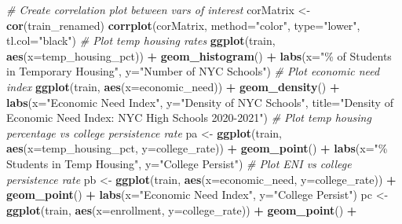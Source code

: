 \documentclass[
  man,floatsintext]{apa6}
\newenvironment{Shaded}{\begin{snugshade}}{\end{snugshade}}
\newcommand{\AttributeTok}[1]{\textcolor[rgb]{0.13,0.29,0.53}{#1}}
\newcommand{\CommentTok}[1]{\textcolor[rgb]{0.56,0.35,0.01}{\textit{#1}}}
\newcommand{\FunctionTok}[1]{\textcolor[rgb]{0.13,0.29,0.53}{\textbf{#1}}}
\newcommand{\NormalTok}[1]{#1}
\newcommand{\OtherTok}[1]{\textcolor[rgb]{0.56,0.35,0.01}{#1}}
\newcommand{\SpecialCharTok}[1]{\textcolor[rgb]{0.81,0.36,0.00}{\textbf{#1}}}
\newcommand{\StringTok}[1]{\textcolor[rgb]{0.31,0.60,0.02}{#1}}
\begin{document}
\begin{Shaded}
\begin{Highlighting}[]
\CommentTok{\# Create correlation plot between vars of interest}
\NormalTok{corMatrix }\OtherTok{\textless{}{-}} \FunctionTok{cor}\NormalTok{(train\_renamed)}
\FunctionTok{corrplot}\NormalTok{(corMatrix, }\AttributeTok{method=}\StringTok{"color"}\NormalTok{, }\AttributeTok{type=}\StringTok{"lower"}\NormalTok{, }\AttributeTok{tl.col=}\StringTok{"black"}\NormalTok{)}
\CommentTok{\# Plot temp housing rates}
\FunctionTok{ggplot}\NormalTok{(train, }\FunctionTok{aes}\NormalTok{(}\AttributeTok{x=}\NormalTok{temp\_housing\_pct)) }\SpecialCharTok{+}
  \FunctionTok{geom\_histogram}\NormalTok{() }\SpecialCharTok{+}
  \FunctionTok{labs}\NormalTok{(}\AttributeTok{x=}\StringTok{"\% of Students in Temporary Housing"}\NormalTok{, }\AttributeTok{y=}\StringTok{"Number of NYC Schools"}\NormalTok{)}
\CommentTok{\# Plot economic need index}
\FunctionTok{ggplot}\NormalTok{(train, }\FunctionTok{aes}\NormalTok{(}\AttributeTok{x=}\NormalTok{economic\_need)) }\SpecialCharTok{+}
  \FunctionTok{geom\_density}\NormalTok{() }\SpecialCharTok{+}
  \FunctionTok{labs}\NormalTok{(}\AttributeTok{x=}\StringTok{"Economic Need Index"}\NormalTok{, }\AttributeTok{y=}\StringTok{"Density of NYC Schools"}\NormalTok{,}
       \AttributeTok{title=}\StringTok{"Density of Economic Need Index: NYC High Schools 2020{-}2021"}\NormalTok{)}
\CommentTok{\# Plot temp housing percentage vs college persistence rate}
\NormalTok{pa }\OtherTok{\textless{}{-}} \FunctionTok{ggplot}\NormalTok{(train, }\FunctionTok{aes}\NormalTok{(}\AttributeTok{x=}\NormalTok{temp\_housing\_pct, }\AttributeTok{y=}\NormalTok{college\_rate)) }\SpecialCharTok{+}
  \FunctionTok{geom\_point}\NormalTok{() }\SpecialCharTok{+}
  \FunctionTok{labs}\NormalTok{(}\AttributeTok{x=}\StringTok{"\% Students in Temp Housing"}\NormalTok{,}
       \AttributeTok{y=}\StringTok{"College Persist"}\NormalTok{)}
\CommentTok{\# Plot ENI vs college persistence rate}
\NormalTok{pb }\OtherTok{\textless{}{-}} \FunctionTok{ggplot}\NormalTok{(train, }\FunctionTok{aes}\NormalTok{(}\AttributeTok{x=}\NormalTok{economic\_need, }\AttributeTok{y=}\NormalTok{college\_rate)) }\SpecialCharTok{+}
  \FunctionTok{geom\_point}\NormalTok{() }\SpecialCharTok{+}
  \FunctionTok{labs}\NormalTok{(}\AttributeTok{x=}\StringTok{"Economic Need Index"}\NormalTok{,}
       \AttributeTok{y=}\StringTok{"College Persist"}\NormalTok{)}
\NormalTok{pc }\OtherTok{\textless{}{-}} \FunctionTok{ggplot}\NormalTok{(train, }\FunctionTok{aes}\NormalTok{(}\AttributeTok{x=}\NormalTok{enrollment, }\AttributeTok{y=}\NormalTok{college\_rate)) }\SpecialCharTok{+}
  \FunctionTok{geom\_point}\NormalTok{() }\SpecialCharTok{+}

\end{Highlighting}
\end{Shaded}
\end{document}
